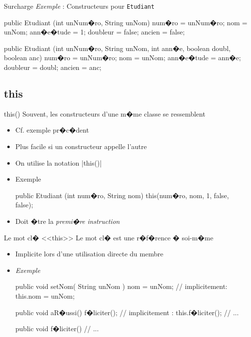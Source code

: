 \begin{frame}[fragile]{Surcharge}
\emph{Exemple} : Constructeurs pour \texttt{Etudiant}
\begin{Java}
  public Etudiant (int unNum�ro, String unNom) {
    num�ro = unNum�ro;
    nom = unNom;
    ann�e�tude = 1;
    doubleur = false;
    ancien = false;
  }

  public Etudiant (int unNum�ro, String unNom, int ann�e, 
                   boolean doubl, boolean anc) {
    num�ro = unNum�ro;
    nom = unNom;
    ann�e�tude = ann�e;
    doubleur = doubl;
    ancien = anc;
  }
\end{Java}
\end{frame}

\subsection{this}

\begin{frame}[fragile]{this()}
Souvent, les constructeurs d'une m�me classe se ressemblent
  \begin{itemize}
  \item Cf. exemple pr�c�dent
  \item Plus facile si un constructeur appelle l'autre
  \item On utilise la notation \java|this()|
  \item Exemple
  \begin{Java}
  public Etudiant (int num�ro, String nom) {
    this(num�ro, nom, 1, false, false);
  }
  \end{Java}
  \item Doit �tre la \emph{premi�re instruction}
  \end{itemize}
\end{frame}

\begin{frame}[fragile]{Le mot cl� <<this>>}
Le mot cl�  est une r�f�rence � soi-m�me 
\begin{itemize}
\item Implicite lors d'une utilisation directe du membre
\item \emph{Exemple}
  \begin{Java}
  public void setNom( String unNom ) {
    nom = unNom;  // implicitement: this.nom = unNom;
  }

  public void aR�ussi() {
    f�liciter(); // implicitement : this.f�liciter();
    // ...
  }

  public void f�liciter() {
    // ...
  }
  \end{Java}
\end{itemize}
\end{frame}

